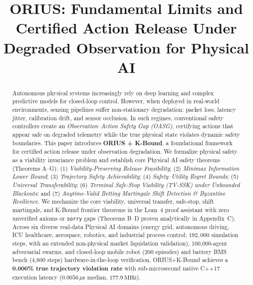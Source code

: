 \documentclass[conference]{IEEEtran}
\begin{document}
\title{ORIUS: Fundamental Limits and Certified Action Release Under Degraded Observation for Physical AI}

\author{
}

\maketitle

\begin{abstract}
Autonomous physical systems increasingly rely on deep learning and complex predictive models for closed-loop control. However, when deployed in real-world environments, sensing pipelines suffer non-stationary degradation: packet loss, latency jitter, calibration drift, and sensor occlusion. In such regimes, conventional safety controllers create an \emph{Observation--Action Safety Gap (OASG)}, certifying actions that appear safe on degraded telemetry while the true physical state violates dynamic safety boundaries. This paper introduces \textbf{ORIUS + K-Bound}, a foundational framework for certified action release under observation degradation. We formalize physical safety as a viability invariance problem and establish core Physical AI safety theorems (Theorems A--G): (1) \emph{Viability-Preserving Release Feasibility}; (2) \emph{Minimax Information Lower Bound}; (3) \emph{Trajectory Safety Achievability}; (4) \emph{Safety--Utility Regret Bounds}; (5) \emph{Universal Transferability}; (6) \emph{Terminal Safe-Stop Viability (TV-SSK) under Unbounded Blackouts}; and (7) \emph{Anytime-Valid Betting Martingale Shift Detection \& Byzantine Resilience}. We mechanize the core viability, universal transfer, safe-stop, shift martingale, and K-Bound frontier theorems in the Lean~4 proof assistant with zero unverified axioms or \texttt{sorry} gaps (Theorems B--D proven analytically in Appendix~C). Across six diverse real-data Physical AI domains (energy grid, autonomous driving, ICU healthcare, aerospace, robotics, and industrial process control; $192,000$ simulation steps, with an extended non-physical market liquidation validation), 100,000-agent adversarial swarms, and closed-loop mobile robot (200 episodes) and battery BMS bench (4,800 steps) hardware-in-the-loop verification, ORIUS+K-Bound achieves a \textbf{0.000\% true trajectory violation rate} with sub-microsecond native C++17 execution latency ($0.0056\,\mu\text{s}$ median, $177.9\,\text{MHz}$).
\end{abstract}
\end{document}

